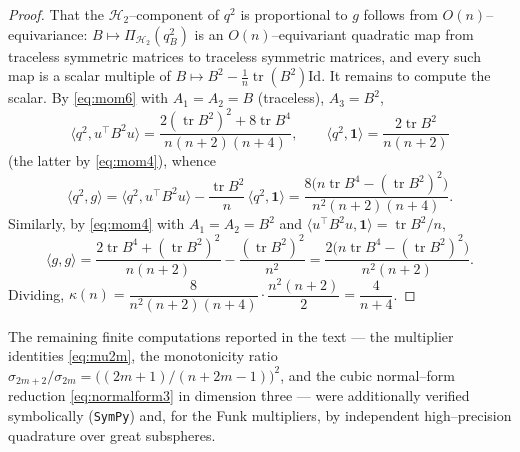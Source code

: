 \documentclass[11pt,reqno]{amsart}
\theoremstyle{plain}
\theoremstyle{definition}
\newcommand{\Hd}[1]{\mathcal{H}_{#1}}
\newcommand{\ip}[2]{\langle #1, #2 \rangle}
\DeclareMathOperator{\tr}{tr}
\begin{document}
\begin{proof}
That the $\Hd2$--component of $q^2$ is proportional to $g$ follows from
$O(n)$--equivariance: $B\mapsto\Pi_{\Hd2}(q_B^2)$ is an $O(n)$--equivariant
quadratic map from traceless symmetric matrices to traceless symmetric
matrices, and every such map is a scalar multiple of
$B\mapsto B^2-\tfrac1n\tr(B^2)\mathrm{Id}$. It remains to compute the scalar.
By \eqref{eq:mom6} with $A_1=A_2=B$ (traceless), $A_3=B^2$,
\[
\ip{q^2}{u^\top B^2u}
=\frac{2(\tr B^2)^2+8\tr B^4}{n(n+2)(n+4)},
\qquad
\ip{q^2}{\mathbf 1}=\frac{2\tr B^2}{n(n+2)}
\]
(the latter by \eqref{eq:mom4}), whence
\[
\ip{q^2}{g}=\ip{q^2}{u^\top B^2u}-\frac{\tr B^2}{n}\,\ip{q^2}{\mathbf 1}
=\frac{8\big(n\tr B^4-(\tr B^2)^2\big)}{n^2(n+2)(n+4)} .
\]
Similarly, by \eqref{eq:mom4} with $A_1=A_2=B^2$ and
$\ip{u^\top B^2u}{\mathbf 1}=\tr B^2/n$,
\[
\ip gg=\frac{2\tr B^4+(\tr B^2)^2}{n(n+2)}-\frac{(\tr B^2)^2}{n^2}
=\frac{2\big(n\tr B^4-(\tr B^2)^2\big)}{n^2(n+2)} .
\]
Dividing, $\kappa(n)=\dfrac{8}{n^2(n+2)(n+4)}\cdot\dfrac{n^2(n+2)}{2}
=\dfrac{4}{n+4}$.
\end{proof}

The remaining finite computations reported in the text --- the multiplier
identities \eqref{eq:mu2m}, the monotonicity ratio
$\sigma_{2m+2}/\sigma_{2m}=\big((2m+1)/(n+2m-1)\big)^2$, and the cubic
normal--form reduction \eqref{eq:normalform3} in dimension three --- were
additionally verified symbolically (\texttt{SymPy}) and, for the Funk
multipliers, by independent high--precision quadrature over great subspheres.
\end{document}
